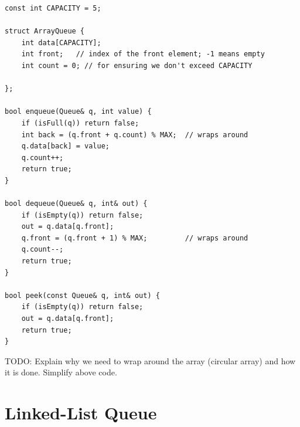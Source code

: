 \begin{verbatim}
const int CAPACITY = 5;

struct ArrayQueue {
    int data[CAPACITY];
    int front;   // index of the front element; -1 means empty
    int count = 0; // for ensuring we don't exceed CAPACITY

};

bool enqueue(Queue& q, int value) {
    if (isFull(q)) return false;
    int back = (q.front + q.count) % MAX;  // wraps around
    q.data[back] = value;
    q.count++;
    return true;
}

bool dequeue(Queue& q, int& out) {
    if (isEmpty(q)) return false;
    out = q.data[q.front];
    q.front = (q.front + 1) % MAX;         // wraps around
    q.count--;
    return true;
}

bool peek(const Queue& q, int& out) {
    if (isEmpty(q)) return false;
    out = q.data[q.front];
    return true;
}
\end{verbatim}

TODO: Explain why we need to wrap around the array (circular array) and how it is done. Simplify above code.

\section{Linked-List Queue}